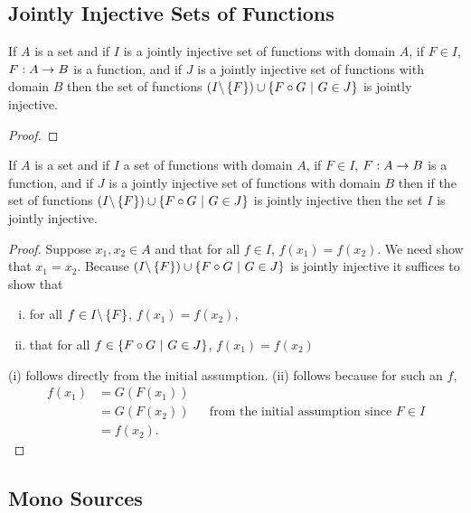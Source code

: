 \subsection{Jointly Injective Sets of Functions}
\begin{lemma}
If $A$ is a set and if $I$  is a jointly injective set of functions with domain $A$, if $F \in I$, $F: A \rightarrow B$ is a function,
and if $J$ is a jointly injective set of functions with domain $B$ then the set of functions
$(I \backslash \left\{F\right\}) \cup \left\{F \circ G \ \middle|\ G \in J\right\}$ is jointly injective.
\end{lemma}
\begin{proof}

\end{proof}

\begin{lemma}
If $A$ is a set and if $I$  a set of functions with domain $A$, if $F \in I$, $F: A \rightarrow B$ is a function,
and if $J$ is a jointly injective set of functions with domain $B$ then if the set of functions
$(I \backslash \left\{F\right\}) \cup \left\{F \circ G \ \middle|\ G \in J\right\}$ is jointly injective then the
set $I$ is jointly injective.
\end{lemma}
\begin{proof}
Suppose $x_1,x_2 \in A$ and that for all $f \in I$, $f(x_1)=f(x_2)$. We need show that $x_1=x_2$.
Because $(I \backslash \left\{F\right\}) \cup \left\{F \circ G \ \middle|\ G \in J\right\}$ is jointly injective
it suffices to show that 
\begin{enumerate}[(i)]
\item
for all $f \in I \backslash \left\{F\right\}$, $f(x_1)=f(x_2)$, 
\item that for all $f \in \left\{F \circ G \ \middle|\ G \in J\right\}$, $f(x_1)=f(x_2)$
\end{enumerate}
(i) follows directly from the initial assumption. 
(ii) follows because for such an $f$, 
\begin{align*}
f(x_1)&=G(F(x_1)) & & \\
      &=G(F(x_2)) & & \mbox{from the initial assumption since }F \in I \\
			&=f(x_2). & &
\end{align*}
\end{proof}

\subsection{Mono Sources}

